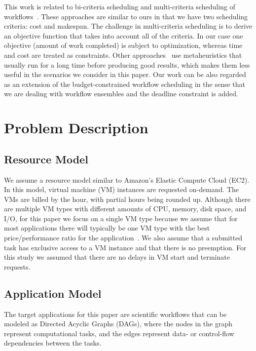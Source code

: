 \documentclass{sig-alternate}
\begin{document}
This work is related to bi-criteria scheduling and multi-criteria scheduling of
workflows~\cite{Wieczorek2009,Prodan10,Dongarra2007}. These approaches are
similar to ours in that we have two scheduling criteria: cost and makespan. The
challenge in multi-criteria scheduling is to derive an objective function that
takes into account all of the criteria. In our case one objective (amount
of work completed) is subject to optimization, whereas time and cost are
treated as constraints. Other approaches~\cite{Talukder2009,Pandey2010} use
metaheuristics that usually run for a long time before producing good results,
which makes them less useful in the scenarios we consider in this paper. Our work can be also
regarded as an extension of the budget-constrained workflow scheduling
\cite{Sakellariou2007} in the sense that we are dealing with workflow ensembles
and the deadline constraint is added.
 
\section{Problem Description}
\label{sec:problem}

\subsection{Resource Model}

We assume a resource model similar to Amazon's Elastic Compute Cloud (EC2). In
this model, virtual machine (VM) instances are requested on-demand. The VMs are
billed by the hour, with partial hours being rounded up. Although there are
multiple VM types with different amounts of CPU, memory, disk space, and I/O,
for this paper we focus on a single VM type because we assume that for most
applications there will typically be one VM type with the best price/performance
ratio for the application~\cite{Juve2009}. We also assume that a submitted task
has exclusive access to a VM instance and that there is no preemption. For this
study we assumed that there are no delays in VM start and terminate requests.


\subsection{Application Model}
The target applications for this paper are scientific workflows that can be
modeled as Directed Acyclic Graphs (DAGs), where the nodes in the graph
represent computational tasks, and the edges represent data- or control-flow
dependencies between the tasks.
\end{document}
